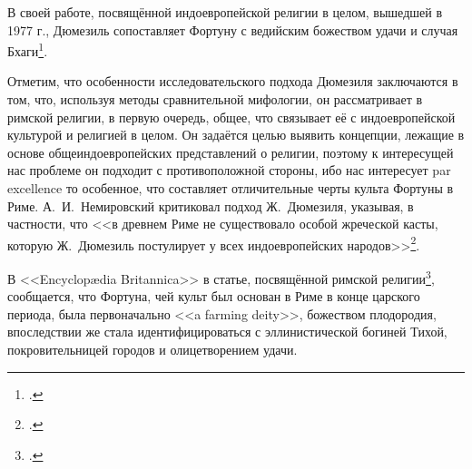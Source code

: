 В своей работе, посвящённой индоевропейской религии в целом, вышедшей в 1977 г., Дюмезиль сопоставляет Фортуну с ведийским божеством удачи и случая Бхаги\footcite[С. 75, 80, 131--132]{Dumezil1986}.

Отметим, что особенности исследовательского подхода Дюмезиля заключаются в том, что, используя методы сравнительной мифологии, он рассматривает в римской религии, в первую очередь, общее, что связывает её с индоевропейской культурой и религией в целом. Он задаётся целью выявить концепции, лежащие в основе общеиндоевропейских представлений о религии, поэтому к интересущей нас проблеме он подходит с противоположной стороны, ибо нас интересует par excellence то особенное, что составляет отличительные черты культа Фортуны в Риме. А.~И.~Немировский критиковал подход Ж.~Дюмезиля, указывая, в частности, что <<в древнем Риме не существовало особой жреческой касты, которую Ж.~Дюмезиль постулирует у всех индоевропейских народов>>\footcite[С. 177]{Nemirovsky1964}.




В <<Encyclop\ae{}dia Britannica>> в статье, посвящённой римской религии\footcite[P. 1063]{Britannica15_1978}, сообщается, что Фортуна, чей культ был основан в Риме в конце царского периода, была первоначально <<a farming deity>>, божеством плодородия, впоследствии же стала идентифицироваться с эллинистической богиней Тихой, покровительницей городов и олицетворением удачи.

